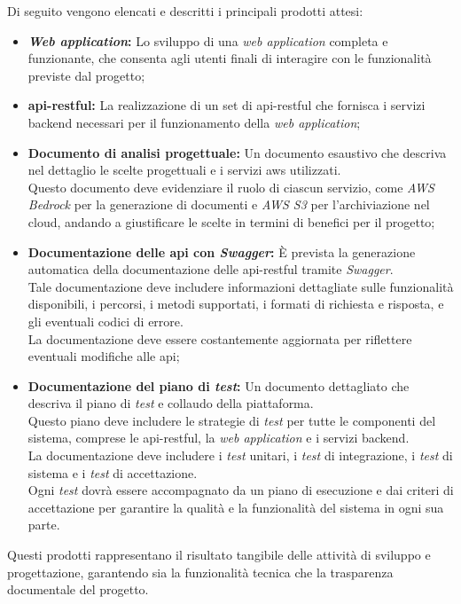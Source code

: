 \noindent Di seguito vengono elencati e descritti i principali prodotti attesi:

\begin{itemize}
    \item \textbf{\textit{Web application}:} Lo sviluppo di una \textit{web application} completa e funzionante, che consenta agli utenti finali di interagire con le funzionalità previste dal progetto;
    \item \textbf{\gls{api-restful}:} La realizzazione di un set di \gls{api-restful} che fornisca i servizi \gls{backend} necessari per il funzionamento della \textit{web application};
    \item \textbf{Documento di analisi progettuale:} Un documento esaustivo che descriva nel dettaglio le scelte progettuali e i servizi \gls{aws} utilizzati.\\
    Questo documento deve evidenziare il ruolo di ciascun servizio, come \textit{AWS Bedrock} per la generazione di documenti e \textit{AWS S3} per l’archiviazione nel cloud, 
    andando a giustificare le scelte in termini di benefici per il progetto;
    \item \textbf{Documentazione delle \gls{api} con \textit{Swagger}:} È prevista la generazione automatica della documentazione delle \gls{api-restful} tramite \textit{Swagger}. \\
    Tale documentazione deve includere informazioni dettagliate sulle funzionalità disponibili, i percorsi, i metodi supportati, i formati di richiesta e risposta, e gli eventuali codici di errore. \\
    La documentazione deve essere costantemente aggiornata per riflettere eventuali modifiche alle \gls{api};
    \item \textbf{Documentazione del piano di \textit{test}:} Un documento dettagliato che descriva il piano di \textit{test} e collaudo della piattaforma. \\
    Questo piano deve includere le strategie di \textit{test} per tutte le componenti del sistema, comprese le \gls{api-restful}, la \textit{web application} e i servizi \gls{backend}.\\
    La documentazione deve includere i \textit{test} unitari, i \textit{test} di integrazione, i \textit{test} di sistema e i \textit{test} di accettazione. \\
    Ogni \textit{test} dovrà essere accompagnato da un piano di esecuzione e dai criteri di accettazione per garantire la qualità e la funzionalità del sistema in ogni sua parte.\\
\end{itemize}

\noindent Questi prodotti rappresentano il risultato tangibile delle attività di sviluppo e progettazione, garantendo sia la funzionalità tecnica che la trasparenza documentale del progetto.


